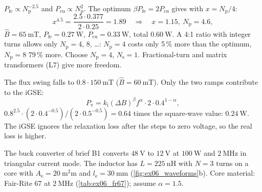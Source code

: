 \begin{solutionblock}
	$P_\mathrm{fe}\propto N_\mathrm{p}^{-2.5}$ and $P_\mathrm{cu}\propto N_\mathrm{p}^2$. The optimum $\beta P_\mathrm{fe}=2P_\mathrm{cu}$ gives with $x=N_\mathrm{p}/4$:
	\begin{equation}
		x^{4.5}=\frac{2.5\cdot0.377}{2\cdot0.25}=1.89\quad\Rightarrow\quad x=1.15,\ N_\mathrm{p}=4.6,
	\end{equation}
	$\hat{B}=\SI{65}{\milli\tesla}$, $P_\mathrm{fe}=\SI{0.27}{\watt}$, $P_\mathrm{cu}=\SI{0.33}{\watt}$, total $\SI{0.60}{\watt}$. A 4:1 ratio with integer turns allows only $N_\mathrm{p}=4$, 8, \dots: $N_\mathrm{p}=4$ costs only 5\,\% more than the optimum, $N_\mathrm{p}=8$ 79\,\% more. Choose $N_\mathrm{p}=4$, $N_\mathrm{s}=1$. Fractional-turn and matrix transformers (L7) give more freedom.
\end{solutionblock}


\begin{solutionblock}
	The flux swing falls to $0.8\cdot\SI{150}{\milli\tesla}$ ($\hat{B}=\SI{60}{\milli\tesla}$). Only the two ramps contribute to the iGSE:
	\begin{equation}
		P_\mathrm{v}=k_\mathrm{i}(\Delta B)^{\beta}f^{\alpha}\cdot2\cdot0.4^{1-\alpha},
	\end{equation}
	$0.8^{2.5}\cdot(2\cdot0.4^{-0.5})/(2\cdot0.5^{-0.5})=0.64$ times the square-wave value: $\SI{0.24}{\watt}$. The iGSE ignores the relaxation loss after the steps to zero voltage, so the real loss is higher.
\end{solutionblock}



The buck converter of brief B1 converts $\SI{48}{\volt}$ to $\SI{12}{\volt}$ at $\SI{100}{\watt}$ and $\SI{2}{\mega\hertz}$ in triangular current mode. The inductor has $L=\SI{225}{\nano\henry}$ with $N=3$ turns on a core with $A_\mathrm{e}=\SI{20}{\square\milli\metre}$ and $l_\mathrm{e}=\SI{30}{\milli\metre}$ (\autoref{fig:ex06_waveforms}b). Core material: Fair-Rite 67 at $\SI{2}{\mega\hertz}$ (\autoref{tab:ex06_fr67}); assume $\alpha=1.5$.

